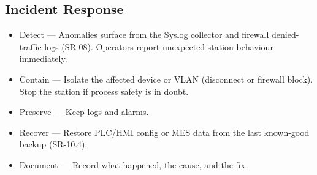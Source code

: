 \subsection{Incident Response}
\begin{itemize}
    \item Detect — Anomalies surface from the Syslog collector and firewall denied-traffic logs (SR-08). Operators report unexpected station behaviour immediately.
    \item Contain — Isolate the affected device or VLAN (disconnect or firewall block). Stop the station if process safety is in doubt.
    \item Preserve — Keep logs and alarms.
    \item Recover — Restore PLC/HMI config or MES data from the last known-good backup (SR-10.4).
    \item Document — Record what happened, the cause, and the fix. 
\end{itemize}

